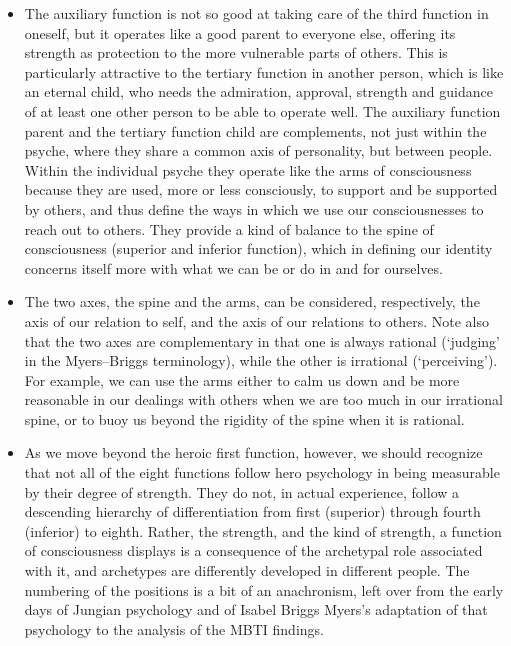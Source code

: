 \begin{itemize}
\item The auxiliary function is not so good at taking care of the third
function in oneself, but it operates like a good parent to everyone else,
offering its strength as protection to the more vulnerable parts of others.
This is particularly attractive to the tertiary function in another person,
which is like an eternal child, who needs the admiration, approval, strength
and guidance of at least one other person to be able to operate well. The
auxiliary function parent and the tertiary function child are complements, not
just within the psyche, where they share a common axis of personality, but
between people. Within the individual psyche they operate like the arms of
consciousness because they are used, more or less consciously, to support and
be supported by others, and thus define the ways in which we use our
consciousnesses to reach out to others. They provide a kind of balance to the
spine of consciousness (superior and inferior function), which in defining our
identity concerns itself more with what we can be or do in and for ourselves.

\item The two axes, the spine and the arms, can be considered, respectively,
the axis of our relation to self, and the axis of our relations to others. Note
also that the two axes are complementary in that one is always rational
(‘judging’ in the Myers–Briggs terminology), while the other is irrational
(‘perceiving’). For example, we can use the arms either to calm us down and be
more reasonable in our dealings with others when we are too much in our
irrational spine, or to buoy us beyond the rigidity of the spine when it is
rational.

\item As we move beyond the heroic first function, however, we should recognize
that not all of the eight functions follow hero psychology in being measurable
by their degree of strength. They do not, in actual experience, follow a
descending hierarchy of differentiation from first (superior) through fourth
(inferior) to eighth. Rather, the strength, and the kind of strength, a
function of consciousness displays is a consequence of the archetypal role
associated with it, and archetypes are differently developed in different
people. The numbering of the positions is a bit of an anachronism, left over
from the early days of Jungian psychology and of Isabel Briggs Myers’s
adaptation of that psychology to the analysis of the MBTI findings.


\end{itemize}
